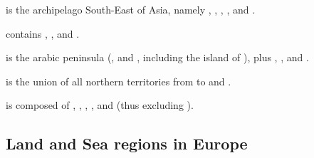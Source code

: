 \begin{deflist}
\item[\anchorcontinent{Indonesia}] is the archipelago South-East of Asia,
  namely , , ,
  ,  and .
\item[\anchorcontinent{Indochina}] contains \granderegionBirmanie,
  \granderegionMalacca, \granderegionAyutthaya and .
\item[\anchorcontinent{Middle East}] is the arabic peninsula
  (\granderegionNedj, \granderegionOman and \granderegionAden, including the
  island of \provinceSocotra), plus \provinceOrmus,
  ,  and
  .
\item[\anchorcontinent{Siberia}] is the union of all northern territories from
   to  and .
\item[\anchorcontinent{Asia}] is composed of ,
  \continentIndia, \continentIndochina, ,
  \continentIndonesia and \granderegionOceania (thus excluding
  \continentSiberia).
\end{deflist}



\subsection{Land and Sea regions in Europe}

